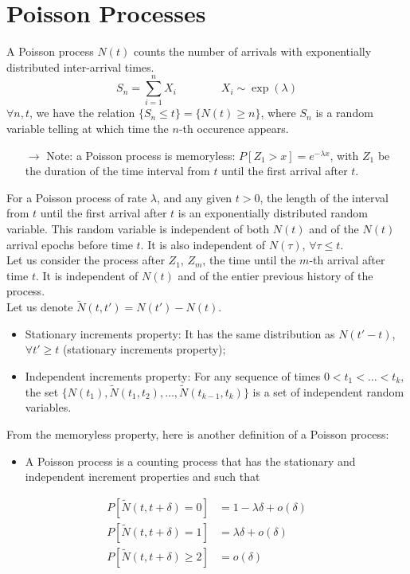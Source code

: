 \documentclass[12pt, openany]{report}
\theoremstyle{definition}
\begin{document}
\chapter{Poisson Processes}\label{chap:poisson}
A Poisson process $N(t)$ counts the number of arrivals with exponentially distributed inter-arrival times. 
\begin{equation}
  S_n = \sum_{i=1}^n X_i \qquad \qquad X_i \sim \exp(\lambda)
\end{equation}
$\forall n,t$, we have the relation $\{S_n\le t\}=\{N(t)\ge n\}$, where $S_n$ is a random variable telling at which time the $n$-th occurence appears.\\
\begin{itemize}
  \item [$\rightarrow$] Note: a Poisson process is memoryless: $P[Z_1>x]=e^{-\lambda x}$, with $Z_1$ be the duration of the time interval from $t$ until the first arrival after $t$.
\end{itemize}
For a Poisson process of rate $\lambda$, and any given $t>0$, the length of the interval from $t$ until the first arrival after $t$ is an exponentially distributed random variable. This random variable is independent of both $N(t)$ and of the $N(t)$ arrival epochs before time $t$. It is also independent of $N(\tau)$, $\forall \tau \le t$.\\

Let us consider the process after $Z_1$, $Z_m$, the time until the $m$-th arrival after time $t$. It is independent of $N(t)$ and of the entier previous history of the process.\\
Let us denote $\tilde N(t,t') = N(t')-N(t)$. 
\begin{itemize}
  \item Stationary increments property: It has the same distribution as $N(t'-t)$, $\forall t'\ge t$ (stationary increments property);
  \item Independent increments property: For any sequence of times $0<t_1<\dots<t_k$, the set $\{N(t_1), \tilde N(t_1,t_2), \dots,\tilde N (t_{k-1}, t_k)\}$ is a set of independent random variables.
\end{itemize}
From the memoryless property, here is another definition of a Poisson process: \\
\begin{itemize}
  \item A Poisson process is a counting process that has the stationary and independent increment properties and such that 
\end{itemize}
\begin{equation}
  \begin{aligned}
    P[\tilde N(t, t+\delta)=0] &= 1-\lambda \delta +o(\delta)\\  P[\tilde N(t, t+\delta)=1] &= \lambda \delta +o(\delta)\\
    P[\tilde N(t, t+\delta)\ge2] &= o(\delta)
  \end{aligned}
\end{equation}
\end{document}

